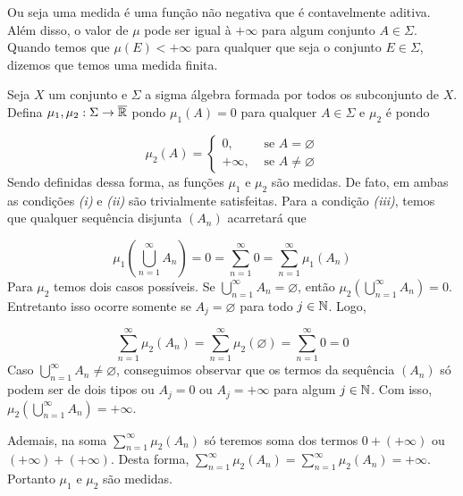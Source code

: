 Ou seja uma medida é uma função não negativa que é contavelmente aditiva.
Além disso, o valor de $\mu$ pode ser igual à $+\infty$ para algum conjunto $A \in \Sigma$.
Quando temos que $\mu(E) < +\infty$ para qualquer que seja o conjunto $E \in \Sigma$, dizemos que temos uma medida finita.


\begin{example}
    Seja $X$ um conjunto e $\Sigma$ a sigma álgebra formada por todos os subconjunto de $X$.    
    Defina $\mu_1, \mu_2:\Sigma \to \operatorname{\overline{\mathbb{R}}}$ pondo $\mu_1(A) = 0$ para qualquer  $A \in \Sigma$ e 
    $\mu_2$ é  pondo 

$$\mu_2(A) = \left\{\begin{array}{cc}
0, & \textrm{\ se \ } A = \varnothing \\
+\infty,& \textrm{\ se \ } A \neq \varnothing
\end{array}\right.$$
Sendo definidas dessa forma, as funções $\mu_1$ e $\mu_2$ são medidas.
De fato, em ambas as condições \textit{(i)} e \textit{(ii)} são trivialmente satisfeitas.
Para a condição \textit{(iii)}, temos que qualquer sequência disjunta $(A_n)$ acarretará que

$$\mu_1\left(\bigcup_{n = 1}^\infty A_n\right) = 0 = \sum_{n = 1}^\infty 0 = \sum_{n = 1}^\infty \mu_1(A_n) $$
Para $\mu_2$ temos dois casos possíveis.
Se  $\displaystyle \bigcup_{n = 1}^\infty A_n  = \varnothing$, então $\mu_2\left(\displaystyle \bigcup_{n = 1}^\infty A_n\right) = 0$. Entretanto isso ocorre somente se $A_j = \varnothing$ para todo $j \in \operatorname{\mathbb{N}}$.
Logo, 

$$\sum_{n = 1}^\infty \mu_2(A_n) = \sum_{n = 1}^\infty \mu_2(\varnothing) = \sum_{n = 1}^\infty 0 = 0$$
Caso $\displaystyle \bigcup_{n = 1}^\infty A_n  \neq  \varnothing$, conseguimos observar que os termos da sequência $(A_n)$ só podem ser de dois tipos ou $A_j = 0$ ou $A_j = +\infty$ para algum $j \in \operatorname{\mathbb{N}}$. Com isso,  $\mu_2\left(\displaystyle \bigcup_{n = 1}^\infty A_n\right) = +\infty$.

Ademais, na soma $\displaystyle \sum_{n = 1}^\infty \mu_2(A_n)$ só teremos soma dos termos $0 + (+ \infty)$ ou $(+\infty) + (+\infty)$.
Desta forma, $\displaystyle \sum_{n = 1}^\infty \mu_2(A_n) = \sum_{n = 1}^\infty \mu_2(A_n) = +\infty$.
Portanto $\mu_1$ e $\mu_2$ são medidas.
\end{example}



